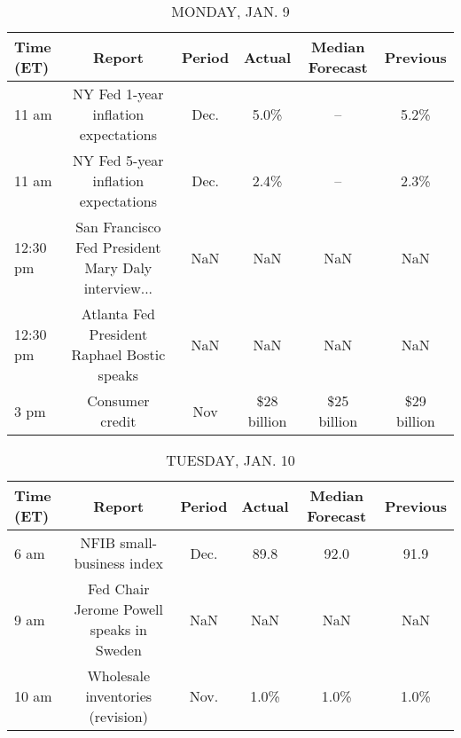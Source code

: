 \documentclass{article}%
\begin{document}
%
\normalsize%


\begin{table}[htbp]%
\caption{MONDAY, JAN. 9}%
\centering%
\begin{adjustbox}{width=1\textwidth}%
\begin{tabular}{lccccc}
\toprule
Time (ET) &                                             Report & Period &      Actual & Median Forecast &    Previous \\
\midrule
    11 am &               NY Fed 1-year inflation expectations &   Dec. &        5.0\% &              -- &        5.2\% \\
    11 am &               NY Fed 5-year inflation expectations &   Dec. &        2.4\% &              -- &        2.3\% \\
 12:30 pm & San Francisco Fed President Mary Daly interview... &    NaN &         NaN &             NaN &         NaN \\
 12:30 pm &        Atlanta Fed President Raphael Bostic speaks &    NaN &         NaN &             NaN &         NaN \\
     3 pm &                                    Consumer credit &    Nov & \$28 billion &     \$25 billion & \$29 billion \\
\bottomrule
\end{tabular}
%
\end{adjustbox}%
\end{table}

%


\begin{table}[htbp]%
\caption{TUESDAY, JAN. 10}%
\centering%
\begin{adjustbox}{width=1\textwidth}%
\begin{tabular}{lccccc}
\toprule
Time (ET) &                                   Report & Period & Actual & Median Forecast & Previous \\
\midrule
     6 am &                NFIB small-business index &   Dec. &   89.8 &            92.0 &     91.9 \\
     9 am & Fed Chair Jerome Powell speaks in Sweden &    NaN &    NaN &             NaN &      NaN \\
    10 am &         Wholesale inventories (revision) &   Nov. &   1.0\% &            1.0\% &     1.0\% \\
\bottomrule
\end{tabular}
%
\end{adjustbox}%
\end{table}
\end{document}
